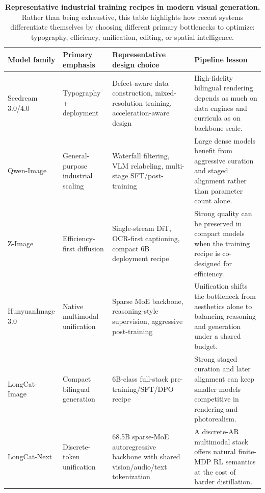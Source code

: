 \begin{table}[t]
\centering
\caption{\textbf{Representative industrial training recipes in modern visual generation.} Rather than being exhaustive, this table highlights how recent systems differentiate themselves by choosing different primary bottlenecks to optimize: typography, efficiency, unification, editing, or spatial intelligence.}
\label{tab:industrial_training_recipes}
\footnotesize
\setlength{\tabcolsep}{3.5pt}
\renewcommand{\arraystretch}{1.12}
\begin{tabularx}{\textwidth}{@{}>{\raggedright\arraybackslash}p{2.9cm}>{\raggedright\arraybackslash}p{2.4cm}>{\raggedright\arraybackslash}p{4.0cm}>{\raggedright\arraybackslash}X@{}}
\toprule
\textbf{Model family} & \textbf{Primary emphasis} & \textbf{Representative design choice} & \textbf{Pipeline lesson} \\
\midrule
Seedream 3.0/4.0 \citep{gao2025seedream,seedream2025seedream} & Typography + deployment & Defect-aware data construction, mixed-resolution training, acceleration-aware design & High-fidelity bilingual rendering depends as much on data engines and curricula as on backbone scale. \\
Qwen-Image \citep{wu2025qwen} & General-purpose industrial scaling & Waterfall filtering, VLM relabeling, multi-stage SFT/post-training & Large dense models benefit from aggressive curation and staged alignment rather than parameter count alone. \\
Z-Image \citep{cai2025z} & Efficiency-first diffusion & Single-stream DiT, OCR-first captioning, compact 6B deployment recipe & Strong quality can be preserved in compact models when the training recipe is co-designed for efficiency. \\
HunyuanImage 3.0 \citep{cao2025hunyuanimage} & Native multimodal unification & Sparse MoE backbone, reasoning-style supervision, aggressive post-training & Unification shifts the bottleneck from aesthetics alone to balancing reasoning and generation under a shared budget. \\
LongCat-Image \citep{team2025longcat} & Compact bilingual generation & 6B-class full-stack pre-training/SFT/DPO recipe & Strong staged curation and later alignment can keep smaller models competitive in rendering and photorealism. \\
LongCat-Next \citep{team2026longcat} & Discrete-token unification & 68.5B sparse-MoE autoregressive backbone with shared vision/audio/text tokenization & A discrete-AR multimodal stack offers natural finite-MDP RL semantics at the cost of harder distillation. \\

\end{tabularx}
\end{table}
